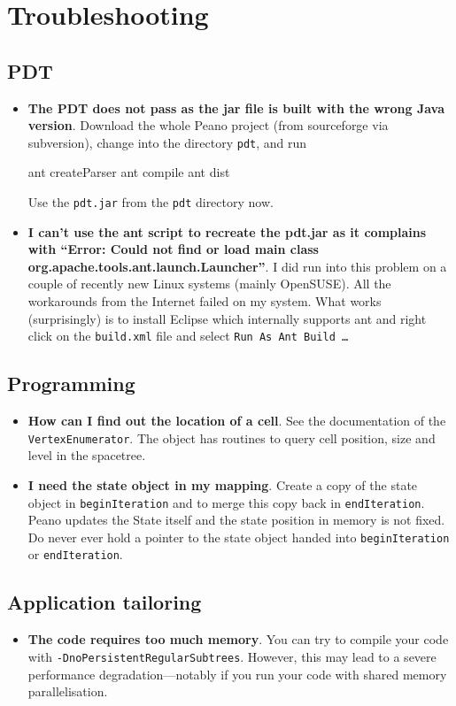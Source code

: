 \chapter{Troubleshooting}

\section{PDT}

\begin{itemize}
  \item {\bf The PDT does not pass as the jar file is built with the wrong Java
  version}. Download the whole Peano project (from sourceforge via subversion),
  change into the directory \texttt{pdt}, and run
  \begin{code}
  ant createParser
  ant compile
  ant dist
  \end{code}
  Use the \texttt{pdt.jar} from the \texttt{pdt} directory now. 
  \item {\bf I can't use the ant script to recreate the pdt.jar as it complains
  with ``Error: Could not find or load main class
  org.apache.tools.ant.launch.Launcher''}. I did run into this problem on a
  couple of recently new Linux systems (mainly OpenSUSE). All the workarounds
  from the Internet failed on my system. What works (surprisingly) is to install
  Eclipse which internally supports ant and right click on the
  \texttt{build.xml} file and select \texttt{Run As Ant Build \ldots}
\end{itemize}





\section{Programming}

\begin{itemize}
  \item {\bf How can I find out the location of a cell}. See the documentation
  of the \texttt{VertexEnumerator}. The object has routines to query cell
  position, size and level in the spacetree.
  \item {\bf I need the state object in my mapping}. Create a copy of the state
  object in \texttt{beginIteration} and to merge this copy back in \texttt{endIteration}. 
  Peano updates the State itself and the state position in memory is not fixed.
  Do never ever hold a pointer to the state object handed into
  \texttt{beginIteration} or \texttt{endIteration}.
\end{itemize}


\section{Application tailoring}

\begin{itemize}
  \item {\bf The code requires too much memory}.
  You can try to compile your code with \texttt{-DnoPersistentRegularSubtrees}.
  However, this may lead to a severe performance degradation---notably if you
  run your code with shared memory parallelisation.
\end{itemize}
